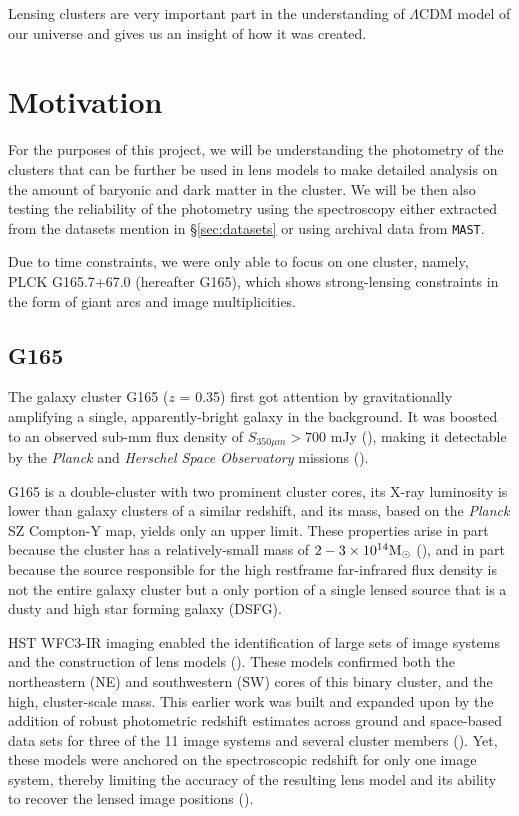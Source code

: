\documentclass[twocolumn,linenumbers]{aastex631}
\begin{document}
Lensing clusters are very important part in the understanding of $\Lambda$CDM model of our universe and gives us an insight of how it was created.

\section{Motivation} \label{sec:motivation}
For the purposes of this project, we will be understanding the photometry of the clusters that can be further be used in lens models to make detailed analysis on the amount of baryonic and dark matter in the cluster. We will be then also testing the reliability of the photometry using the spectroscopy either extracted from the datasets mention in \S  \ref{sec:datasets} or using archival data from \texttt{MAST}.

Due to time constraints, we were only able to focus on one cluster, namely, PLCK G165.7+67.0 (hereafter G165), which shows strong-lensing constraints in the form of giant arcs and image multiplicities.

\subsection{G165}
The galaxy cluster G165 ($z$ = 0.35) first got attention by gravitationally amplifying a single, apparently-bright galaxy in the background. It was boosted to an observed sub-mm flux density of $S_{350 \mu m} > 700$ mJy (\cite{canameras2015planck, harrington2016early}), making it detectable by the \textit{Planck} and \textit{Herschel Space Observatory} missions (\cite{ade2016xxvi, aghanim2020planck}). 

G165 is a double-cluster with two prominent cluster cores, its X-ray luminosity is lower than galaxy clusters of a similar redshift, and its mass, based on the \textit{Planck} SZ Compton-Y map, yields only an upper limit. These properties arise in part because the cluster has a relatively-small mass of $2-3 \times 10^{14} \rm{M_\odot}$ (\cite{frye2019plck, pascale2022possible}), and in part because the source responsible for the high restframe far-infrared flux density is not the entire galaxy cluster but a only portion of a single lensed source that is a dusty and high star forming galaxy (DSFG).

HST WFC3-IR imaging enabled the identification of large sets of image systems and the construction of lens models (\cite{frye2019plck}). These models confirmed both the northeastern (NE) and southwestern (SW) cores of this binary cluster, and the high, cluster-scale mass. This earlier work was built and expanded upon by the addition of robust photometric redshift estimates across ground and space-based data sets for three of the 11 image systems and several cluster members (\cite{pascale2022possible}). Yet, these models were anchored on the spectroscopic redshift for only one image system, thereby limiting the accuracy of the resulting lens model and its ability to recover the lensed image positions (\cite{johnson2016systematics}).
\end{document}
